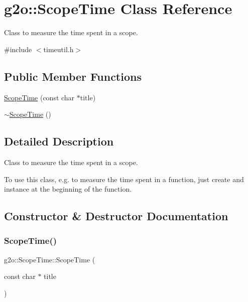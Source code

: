 \hypertarget{classg2o_1_1_scope_time}{}\section{g2o\+:\+:Scope\+Time Class Reference}
\label{classg2o_1_1_scope_time}


Class to measure the time spent in a scope.  




{\ttfamily \#include $<$timeutil.\+h$>$}

\subsection*{Public Member Functions}
\begin{DoxyCompactItemize}
\item 
\mbox{\hyperlink{classg2o_1_1_scope_time_ae9178f069977b767d21e314aab0c3bf2}{Scope\+Time}} (const char $\ast$title)
\item 
\mbox{\hyperlink{classg2o_1_1_scope_time_afec269ec984e05313a28dda5eed02abc}{$\sim$\+Scope\+Time}} ()
\end{DoxyCompactItemize}


\subsection{Detailed Description}
Class to measure the time spent in a scope. 

To use this class, e.\+g. to measure the time spent in a function, just create and instance at the beginning of the function. 

\subsection{Constructor \& Destructor Documentation}
\mbox{\label{classg2o_1_1_scope_time_ae9178f069977b767d21e314aab0c3bf2}} 
\subsubsection{\texorpdfstring{Scope\+Time()}{ScopeTime()}}
{\footnotesize\ttfamily g2o\+::\+Scope\+Time\+::\+Scope\+Time (\begin{DoxyParamCaption}\item[{const char $\ast$}]{title }\end{DoxyParamCaption})}

